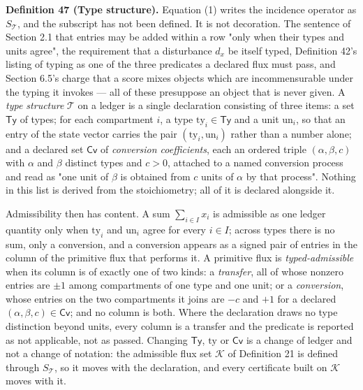 \documentclass[11pt]{article}
\begin{document}
\textbf{Definition 47 (Type structure).} Equation (1) writes the incidence operator as \(S_{\mathcal{T}}\), and the subscript has not been defined. It is not decoration. The sentence of Section 2.1 that entries may be added within a row "only when their types and units agree", the requirement that a disturbance \(d_x\) be itself typed, Definition 42's listing of typing as one of the three predicates a declared flux must pass, and Section 6.5's charge that a score mixes objects which are incommensurable under the typing it invokes --- all of these presuppose an object that is never given. A \emph{type structure} \(\mathcal{T}\) on a ledger is a single declaration consisting of three items: a set \(\mathsf{Ty}\) of types; for each compartment \(i\), a type \(\mathrm{ty}_i \in \mathsf{Ty}\) and a unit \(\mathrm{un}_i\), so that an entry of the state vector carries the pair \((\mathrm{ty}_i,\allowbreak{} \mathrm{un}_i)\) rather than a number alone; and a declared set \(\mathsf{Cv}\) of \emph{conversion coefficients}, each an ordered triple \((\alpha, \beta, c)\) with \(\alpha\) and \(\beta\) distinct types and \(c > 0\), attached to a named conversion process and read as "one unit of \(\beta\) is obtained from \(c\) units of \(\alpha\) by that process". Nothing in this list is derived from the stoichiometry; all of it is declared alongside it.

Admissibility then has content. A sum \(\sum_{i \in I} x_i\) is admissible as one ledger quantity only when \(\mathrm{ty}_i\) and \(\mathrm{un}_i\) agree for every \(i \in I\); across types there is no sum, only a conversion, and a conversion appears as a signed pair of entries in the column of the primitive flux that performs it. A primitive flux is \emph{typed-admissible} when its column is of exactly one of two kinds: a \emph{transfer}, all of whose nonzero entries are \(\pm 1\) among compartments of one type and one unit; or a \emph{conversion}, whose entries on the two compartments it joins are \(-c\) and \(+1\) for a declared \((\alpha,\allowbreak{} \beta,\allowbreak{} c) \in \mathsf{Cv}\); and no column is both. Where the declaration draws no type distinction beyond units, every column is a transfer and the predicate is reported as not applicable, not as passed. Changing \(\mathsf{Ty}\), \(\mathrm{ty}\) or \(\mathsf{Cv}\) is a change of ledger and not a change of notation: the admissible flux set \(\mathcal{K}\) of Definition 21 is defined through \(S_{\mathcal{T}}\), so it moves with the declaration, and every certificate built on \(\mathcal{K}\) moves with it.
\end{document}
